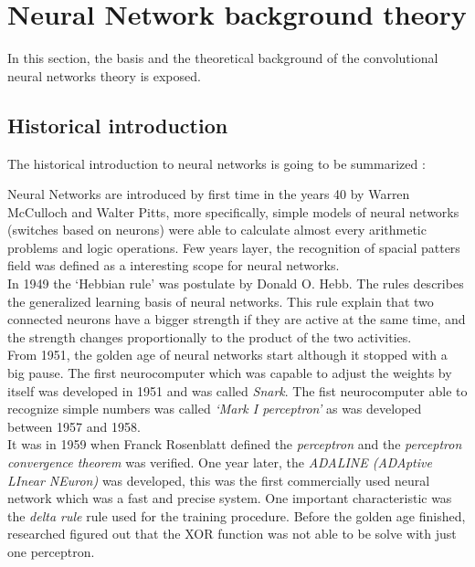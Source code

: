 \section{Neural Network background theory}
In this section, the basis and the theoretical background of the convolutional neural networks theory is exposed.\\

\subsection{Historical introduction}
The historical introduction to neural networks is going to be summarized \cite{DKriesel}:

Neural Networks are introduced by first time in the years 40 by Warren McCulloch and Walter Pitts, more specifically, simple models of neural networks (switches based on neurons) were able to calculate almost every arithmetic problems and logic operations. Few years layer, the recognition of spacial patters field was defined as a interesting scope for neural networks.\\

In 1949 the `Hebbian rule' was postulate by Donald O. Hebb. The rules describes the generalized learning basis of neural networks. This rule explain that two connected neurons have  a bigger strength if they are active at the same time, and the strength changes proportionally to the product of the two activities.\\

From 1951, the golden age of neural networks start although it stopped with a big pause. The first neurocomputer which was capable to adjust the weights by itself was developed in 1951 and was called \textit{Snark}. The fist neurocomputer able to recognize simple numbers was called \textit{`Mark I perceptron'} as was developed between 1957 and 1958.\\

It was in 1959 when Franck Rosenblatt  defined the \textit{perceptron} and the \textit{perceptron convergence theorem} was verified. One year later, the \textit{ADALINE (ADAptive LInear NEuron)} was developed, this was the first commercially used neural network which was a fast and precise system. One important characteristic was the \textit{delta rule} rule used for the training procedure. Before the golden age finished, researched figured out that the XOR function was not able to be solve with just one perceptron.\\

